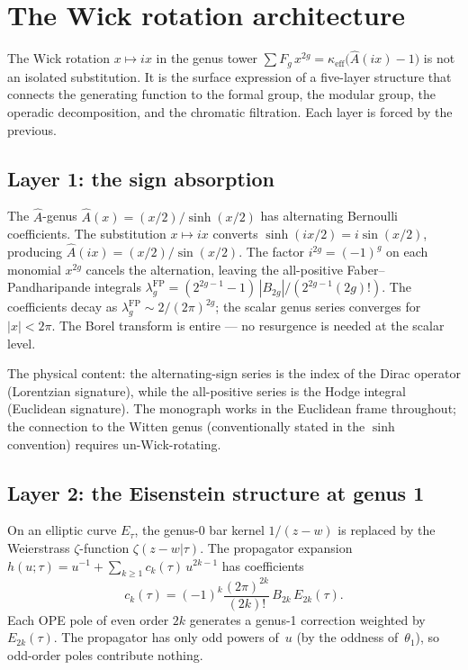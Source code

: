 \documentclass[11pt]{article}
\begin{document}
\section{The Wick rotation architecture}
\label{sec:wick-architecture}

The Wick rotation $x \mapsto ix$ in the genus tower
$\sum F_g\,x^{2g} = \kappa_{\mathrm{eff}}\bigl(\hat{A}(ix) - 1\bigr)$
is not an isolated substitution.  It is the surface expression
of a five-layer structure that connects the generating function
to the formal group, the modular group, the operadic decomposition,
and the chromatic filtration.  Each layer is forced by the previous.

\subsection{Layer 1: the sign absorption}

The $\hat{A}$-genus $\hat{A}(x) = (x/2)/\sinh(x/2)$ has
alternating Bernoulli coefficients.  The substitution $x \mapsto ix$
converts $\sinh(ix/2) = i\sin(x/2)$, producing
$\hat{A}(ix) = (x/2)/\sin(x/2)$.
The factor $i^{2g} = (-1)^g$ on each monomial $x^{2g}$
cancels the alternation, leaving the all-positive
Faber--Pandharipande integrals
$\lambda_g^{\mathrm{FP}} = (2^{2g-1}-1)\,|B_{2g}|/(2^{2g-1}(2g)!)$.
The coefficients decay as $\lambda_g^{\mathrm{FP}} \sim 2/(2\pi)^{2g}$;
the scalar genus series converges for $|x| < 2\pi$.  The Borel
transform is entire --- no resurgence is needed at the scalar level.

The physical content: the alternating-sign series is the index
of the Dirac operator (Lorentzian signature), while the all-positive
series is the Hodge integral (Euclidean signature).  The monograph
works in the Euclidean frame throughout; the connection to the
Witten genus (conventionally stated in the $\sinh$ convention)
requires un-Wick-rotating.

\subsection{Layer 2: the Eisenstein structure at genus 1}

On an elliptic curve $E_\tau$, the genus-0 bar kernel
$1/(z-w)$ is replaced by the Weierstrass $\zeta$-function
$\zeta(z{-}w|\tau)$.  The propagator expansion
$h(u;\tau) = u^{-1} + \sum_{k \ge 1} c_k(\tau)\,u^{2k-1}$
has coefficients
\[
c_k(\tau) = (-1)^k \frac{(2\pi)^{2k}}{(2k)!}\,B_{2k}\,E_{2k}(\tau).
\]
Each OPE pole of even order $2k$ generates a genus-1 correction
weighted by $E_{2k}(\tau)$.  The propagator has only odd powers
of~$u$ (by the oddness of~$\theta_1$), so odd-order poles contribute
nothing.
\end{document}
